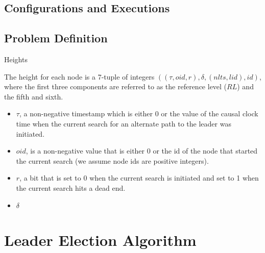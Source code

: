 \documentclass{beamer}
\begin{document}
\subsection{Configurations and Executions}
\begin{frame}

\end{frame}


\subsection{Problem Definition}

\begin{frame}{Heights}

The height for each node is a 7-tuple of integers $((\tau , oid, r), \delta, (nlts, lid), id)$, where the first three components are referred to as the reference level ($RL$) and the fifth and sixth.

\begin{itemize}
	\item $\tau$, a non-negative timestamp which is either 0 or the value of the causal clock time when the current search for an alternate path to the leader was initiated.
	\item $oid$, is a non-negative value that is either 0 or the id of the node that started the current search (we assume node ids are positive integers).
	\item $r$, a bit that is set to 0 when the current search is initiated and set to 1 when the current search hits a dead end.
	\item $\delta$

\end{itemize}

\end{frame}

\section{Leader Election Algorithm}
\end{document}
